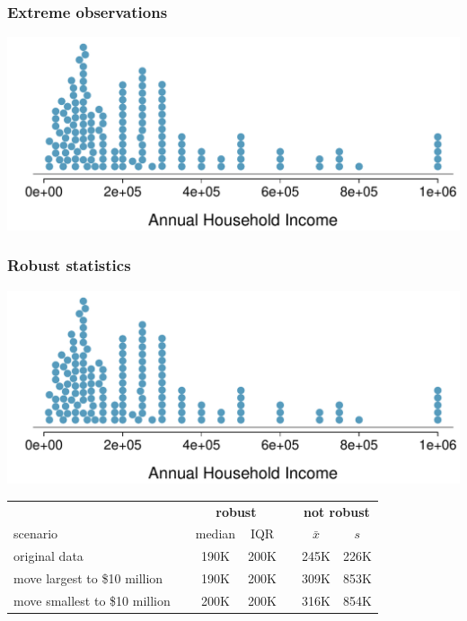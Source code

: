 
\begin{frame}
\frametitle{Extreme observations}


\begin{center}
\includegraphics[width=\textwidth]{2-1_numerical_data/figures/house_income/house_income_dot_stacked}
\end{center}

\end{frame}


\begin{frame}
\frametitle{Robust statistics}

\begin{center}
\includegraphics[width=\textwidth]{2-1_numerical_data/figures/house_income/house_income_dot_stacked}
\end{center}

{\small
\begin{center}
\begin{tabular}{l c cc c cc}
  \hline
& \hspace{0mm} & \multicolumn{2}{c}{\bf robust} & \hspace{2mm} & \multicolumn{2}{c}{\bf not robust} \\
scenario && median & IQR && $\bar{x}$ & $s$ \\ 
  \hline
original data && 190K & 200K && 245K & 226K \\ 
move largest to \$10 million && 190K & 200K && 309K & 853K \\ 
move smallest to \$10 million && 200K & 200K && 316K & 854K \\ 
   \hline
\end{tabular}
\end{center}
}

\end{frame}

